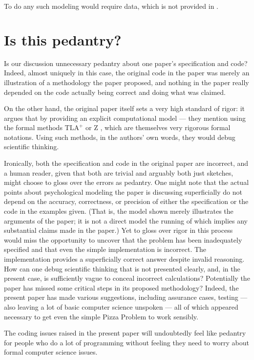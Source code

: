 \documentclass[11pt]{article}
\begin{document}
To do any such modeling would require data, which is not provided in \cite{pizzap}.

\section{Is this pedantry?}\label{section:pedantry}
Is our discussion unnecessary pedantry about one paper's specification and code? Indeed, almost uniquely in this case, the original code in the paper \cite{pizzap} was merely an illustration of a methodology the paper proposed, and nothing in the paper really depended on the code actually being correct and doing what was claimed.

On the other hand, the original paper itself sets a very high standard of rigor: it argues that by providing an explicit computational model --- they mention using the formal methods $\mbox{TLA}^{+}$ \cite{tla} or Z \cite{z}, which are themselves very rigorous formal notations. Using such methods, in the authors' own words, they would debug scientific thinking.

Ironically, both the specification and code in the original paper are incorrect, and a human reader, given that both are trivial and arguably both just sketches, might choose to gloss over the errors as pedantry. One might note that the actual points about psychological modeling the paper is discussing superficially do not depend on the accuracy, correctness, or precision of either the specification or the code in the examples given. (That is, the model shown merely illustrates the arguments of the paper; it is not a direct model the running of which implies any substantial claims made in the paper.) Yet to gloss over rigor in this process would miss the opportunity to uncover that the problem has been inadequately specified and that even the simple implementation is incorrect. The implementation provides a superficially correct answer despite invalid reasoning. How can one debug scientific thinking that is not presented clearly, and, in the present case, is sufficiently vague to conceal incorrect calculations? Potentially the paper \cite{pizzap} has missed some critical steps in its proposed methodology? Indeed, the present paper has made various suggestions, including assurance cases, testing --- also leaving a lot of basic computer science unspoken --- all of which appeared necessary to get even the simple Pizza Problem to work sensibly.

The coding issues raised in the present paper will undoubtedly feel like pedantry for people who do a lot of programming without feeling they need to worry about formal computer science issues. 
\end{document}
